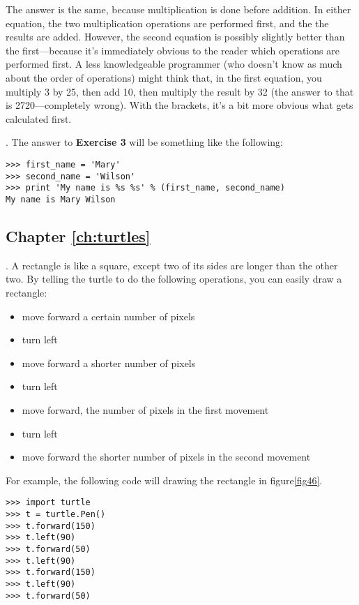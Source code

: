 \noindent
The answer is the same, because multiplication is done before addition.  In either equation, the two multiplication operations are performed first, and the the results are added.  However, the second equation is possibly slightly better than the first---because it's immediately obvious to the reader which operations are performed first.  A less knowledgeable programmer (who doesn't know as much about the order of operations) might think that, in the first equation, you multiply 3 by 25, then add 10, then multiply the result by 32 (the answer to that is 2720---completely wrong).  With the brackets, it's a bit more obvious what gets calculated first.

.  The answer to \textbf{Exercise 3} will be something like the following:

\begin{listing}
\begin{verbatim}
>>> first_name = 'Mary'
>>> second_name = 'Wilson'
>>> print 'My name is %s %s' % (first_name, second_name)
My name is Mary Wilson
\end{verbatim}
\end{listing}

\subsection*{Chapter \ref{ch:turtles}}

. A rectangle is like a square, except two of its sides are longer than the other two.  By telling the turtle to do the following operations, you can easily draw a rectangle:

\begin{itemize}
 \item move forward a certain number of pixels
 \item turn left
 \item move forward a shorter number of pixels
 \item turn left
 \item move forward, the number of pixels in the first movement
 \item turn left
 \item move forward the shorter number of pixels in the second movement
\end{itemize}

\noindent
For example, the following code will drawing the rectangle in figure\ref{fig46}.

\begin{listing}
\begin{verbatim}
>>> import turtle
>>> t = turtle.Pen()
>>> t.forward(150)
>>> t.left(90)
>>> t.forward(50)
>>> t.left(90)
>>> t.forward(150)
>>> t.left(90)
>>> t.forward(50)
\end{verbatim}
\end{listing}

